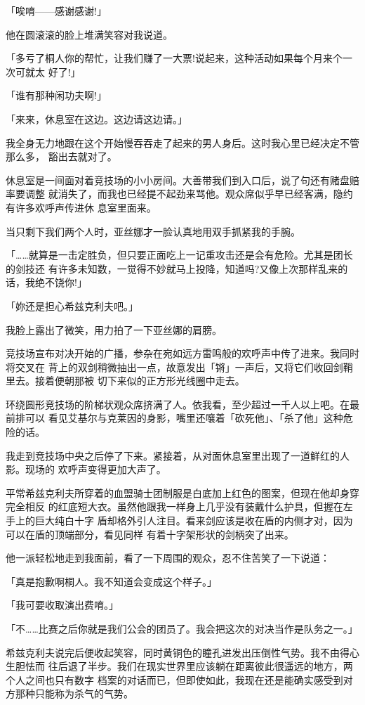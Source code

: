 \documentclass[11pt]{book}
\begin{document}
「唉唷——感谢感谢!」

他在圆滚滚的脸上堆满笑容对我说道。

「多亏了桐人你的帮忙，让我们赚了一大票!说起来，这种活动如果每个月来个一次可就太
好了!」

「谁有那种闲功夫啊!」

「来来，休息室在这边。这边请这边请。」

我全身无力地跟在这个开始慢吞吞走了起来的男人身后。这时我心里已经决定不管那么多，
豁出去就对了。

休息室是一间面对着竞技场的小小房间。大善带我们到入口后，说了句还有赌盘赔率要调整
就消失了，而我也已经提不起劲来骂他。观众席似乎早已经客满，隐约有许多欢呼声传进休
息室里面来。

当只剩下我们两个人时，亚丝娜才一脸认真地用双手抓紧我的手腕。

「……就算是一击定胜负，但只要正面吃上一记重攻击还是会有危险。尤其是团长的剑技还
有许多未知数，一觉得不妙就马上投降，知道吗?又像上次那样乱来的话，我绝不饶你!」

「妳还是担心希兹克利夫吧。」

我脸上露出了微笑，用力拍了一下亚丝娜的肩膀。

竞技场宣布对决开始的广播，参杂在宛如远方雷鸣般的欢呼声中传了进来。我同时将交叉在
背上的双剑稍微抽出一点，故意发出「锵」一声后，又将它们收回剑鞘里去。接着便朝那被
切下来似的正方形光线圈中走去。

环绕圆形竞技场的阶梯状观众席挤满了人。依我看，至少超过一千人以上吧。在最前排可以
看见艾基尔与克莱因的身影，嘴里还嚷着「砍死他」、「杀了他」这种危险的话。

我走到竞技场中央之后停了下来。紧接着，从对面休息室里出现了一道鲜红的人影。现场的
欢呼声变得更加大声了。

平常希兹克利夫所穿着的血盟骑士团制服是白底加上红色的图案，但现在他却身穿完全相反
的红底短大衣。虽然他跟我一样身上几乎没有装戴什么护具，但握在左手上的巨大纯白十字
盾却格外引人注目。看来剑应该是收在盾的内侧才对，因为可以在盾的顶端部分，看见同样
有着十字架形状的剑柄突了出来。

他一派轻松地走到我面前，看了一下周围的观众，忍不住苦笑了一下说道：

「真是抱歉啊桐人。我不知道会变成这个样子。」

「我可要收取演出费唷。」

「不……比赛之后你就是我们公会的团员了。我会把这次的对决当作是队务之一。」

希兹克利夫说完后便收起笑容，同时黄铜色的瞳孔进发出压倒性气势。我不由得心生胆怯而
往后退了半步。我们在现实世界里应该躺在距离彼此很遥远的地方，两个人之间也只有数字
档案的对话而已，但即使如此，我现在还是能确实感受到对方那种只能称为杀气的气势。
\end{document}
